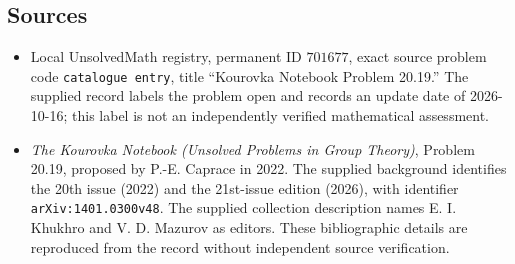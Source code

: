 \documentclass[11pt]{article}
\begin{document}
\subsection{Sources}
\begin{itemize}
\item Local UnsolvedMath registry, permanent ID \(701677\), exact source problem code \texttt{catalogue entry}, title ``Kourovka Notebook Problem 20.19.'' The supplied record labels the problem open and records an update date of 2026-10-16; this label is not an independently verified mathematical assessment.
\item \emph{The Kourovka Notebook (Unsolved Problems in Group Theory)}, Problem 20.19, proposed by P.-E. Caprace in 2022. The supplied background identifies the 20th issue (2022) and the 21st-issue edition (2026), with identifier \texttt{arXiv:1401.0300v48}. The supplied collection description names E. I. Khukhro and V. D. Mazurov as editors. These bibliographic details are reproduced from the record without independent source verification.
\end{itemize}
\end{document}
